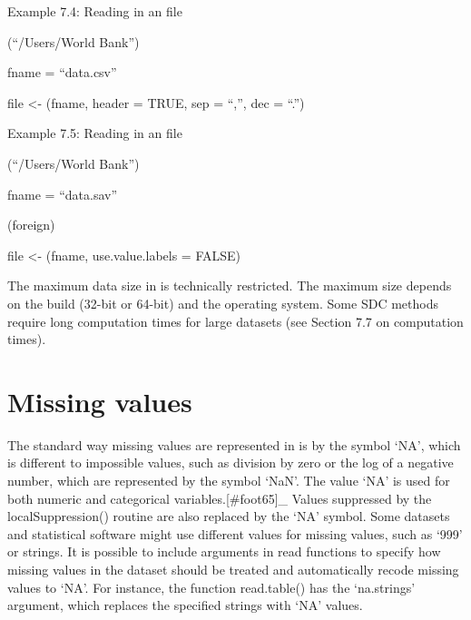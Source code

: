 \documentclass[letterpaper,10pt,english]{sphinxmanual}
\begin{document}
Example 7.4: Reading in an  file

\begin{DUlineblock}{0em}
\item[] (“/Users/World Bank”) 
\item[] fname = “data.csv” 
\item[] file \textless{}- (fname, header = TRUE, sep = “,”, dec = “.”)
\item[] 
\end{DUlineblock}

Example 7.5: Reading in an  file

\begin{DUlineblock}{0em}
\item[] (“/Users/World Bank”) 
\item[] fname = “data.sav” 
\item[] (foreign) 
\item[] file \textless{}- (fname, use.value.labels = FALSE)
\item[] 
\end{DUlineblock}

The maximum data size in  is technically restricted. The maximum size
depends on the  build (32-bit or 64-bit) and the operating system.
Some SDC methods require long computation times for large datasets (see
Section 7.7 on computation times).


\section{Missing values}
\label{\detokenize{sdcMicro:missing-values}}
The standard way missing values are represented in  is by the symbol
‘NA’, which is different to impossible values, such as division by zero
or the log of a negative number, which are represented by the symbol
‘NaN’. The value ‘NA’ is used for both numeric and categorical
variables.{[}\#foot65{]}\_ Values suppressed by the
localSuppression() routine are also replaced by the ‘NA’ symbol. Some
datasets and statistical software might use different values for missing
values, such as ‘999’ or strings. It is possible to include arguments in
read functions to specify how missing values in the dataset should be
treated and automatically recode missing values to ‘NA’. For instance,
the function read.table() has the ‘na.strings’ argument, which replaces
the specified strings with ‘NA’ values.
\end{document}
